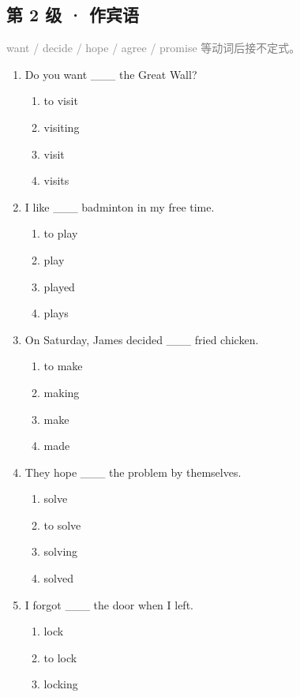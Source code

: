 \documentclass[11pt,a4paper]{ctexart}
\begin{document}
\subsection*{第 2 级 · 作宾语}
\noindent\textcolor{gray}{want / decide / hope / agree / promise 等动词后接不定式。}\par\smallskip
\begin{enumerate}[leftmargin=*,itemsep=4pt]
\item Do you want \_\_\_ the Great Wall?
\begin{enumerate}[label=\Alph*.,leftmargin=2em,itemsep=1pt,topsep=2pt]
\item to visit
\item visiting
\item visit
\item visits
\end{enumerate}
\item I like \_\_\_ badminton in my free time.
\begin{enumerate}[label=\Alph*.,leftmargin=2em,itemsep=1pt,topsep=2pt]
\item to play
\item play
\item played
\item plays
\end{enumerate}
\item On Saturday, James decided \_\_\_ fried chicken.
\begin{enumerate}[label=\Alph*.,leftmargin=2em,itemsep=1pt,topsep=2pt]
\item to make
\item making
\item make
\item made
\end{enumerate}
\item They hope \_\_\_ the problem by themselves.
\begin{enumerate}[label=\Alph*.,leftmargin=2em,itemsep=1pt,topsep=2pt]
\item solve
\item to solve
\item solving
\item solved
\end{enumerate}
\item I forgot \_\_\_ the door when I left.
\begin{enumerate}[label=\Alph*.,leftmargin=2em,itemsep=1pt,topsep=2pt]
\item lock
\item to lock
\item locking

\end{enumerate}
\end{enumerate}
\end{document}
